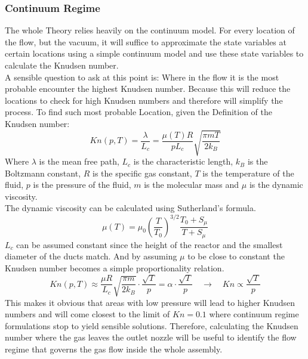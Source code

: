 
\subsubsection{Continuum Regime}
	The whole Theory relies heavily on the continuum model.
	For every location of the flow, but the vacuum, it will suffice to approximate the state variables at certain locations using a simple continuum model and use these state variables to calculate the Knudsen number.\\
	A sensible question to ask at this point is: Where in the flow it is the most probable encounter the highest Knudsen number.
	Because this will reduce the locations to check for high Knudsen numbers and therefore will simplify the process.
	To find such most probable Location, given the Definition of the Knudsen number:
	$$
		Kn(p,T) = \frac{\lambda}{L_c} = \frac{\mu(T)R}{pL_c}\sqrt{\frac{\pi m T}{2k_B}}
	$$
	Where $\lambda$ is the mean free path, $L_c$ is the characteristic length, $k_B$ is the Boltzmann constant, $R$ is the specific gas constant, $T$ is the temperature of the fluid, $p$ is the pressure of the fluid, $m$ is the molecular mass and $\mu$ is the dynamic viscosity.\\
	The dynamic viscosity can be calculated using Sutherland's formula.
	$$
		\mu(T) = \mu_0 \left(\frac{T}{T_0}\right)^{3/2} \frac{T_0 + S_\mu}{T + S_\mu}
	$$
	$L_c$ can be assumed constant since the height of the reactor and the smallest diameter of the ducts match.
	And by assuming $\mu$ to be close to constant the Knudsen number becomes a simple proportionality relation.
	$$
		Kn(p,T)\approx\frac{\mu R}{L_c}\sqrt{\frac{\pi m}{2k_B}}\cdot\frac{\sqrt{T}}{p}=\alpha\cdot\frac{\sqrt{T}}{p}\quad\rightarrow\quad Kn\propto \frac{\sqrt{T}}{p}
	$$
	This makes it obvious that areas with low pressure will lead to higher Knudsen numbers and will come closest to the limit of $Kn=0.1$ where continuum regime formulations stop to yield sensible solutions.
	Therefore, calculating the Knudsen number where the gas leaves the outlet nozzle will be useful to identify the flow regime that governs the gas flow inside the whole assembly.

	

